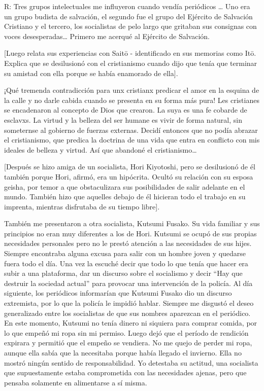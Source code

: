 \documentclass[
]{book}
\begin{document}
R: Tres grupos intelectuales me influyeron cuando vendía periódicos \ldots{} Uno era un grupo budista de salvación, el segundo fue el grupo del Ejército de Salvación Cristiano y el tercero, los socialistas de pelo largo que gritaban sus consignas con voces desesperadas\ldots{} Primero me acerqué al Ejército de Salvación.

{[}Luego relata sus experiencias con Saitō - identificado en sus memorias como Itō. Explica que se desilusionó con el cristianismo cuando dijo que tenía que terminar su amistad con ella porque se había enamorado de ella{]}.

¡Qué tremenda contradicción para unx cristianx predicar el amor en la esquina de la calle y no darle cabida cuando se presenta en su forma más pura! Les cristianes se encadenaron al concepto de Dios que crearon. La suya es una fe cobarde de esclavxs. La virtud y la belleza del ser humane es vivir de forma natural, sin someternse al gobierno de fuerzas externas. Decidí entonces que no podía abrazar el cristianismo, que predica la doctrina de una vida que entra en conflicto con mis ideales de belleza y virtud. Así que abandoné el cristianismo\ldots{}

{[}Después se hizo amiga de un socialista, Hori Kiyotoshi, pero se desilusionó de él también porque Hori, afirmó, era un hipócrita. Ocultó su relación con su esposa geisha, por temor a que obstaculizara sus posibilidades de salir adelante en el mundo. También hizo que aquelles debajo de él hicieran todo el trabajo en su imprenta, mientras disfrutaba de su tiempo libre{]}.

También me presentaron a otra socialista, Kutsumi Fusako. Su vida familiar y sus principios no eran muy diferentes a los de Hori. Kutsumi se ocupó de sus propias necesidades personales pero no le prestó atención a las necesidades de sus hijes. Siempre encontraba alguna excusa para salir con un hombre joven y quedarse fuera todo el día. Una vez la escuché decir que todo lo que tenía que hacer era subir a una plataforma, dar un discurso sobre el socialismo y decir ``Hay que destruir la sociedad actual'' para provocar una intervención de la policía. Al día siguiente, los periódicos informarían que Kutsumi Fusako dio un discurso extremista, por lo que la policía le impidió hablar. Siempre me disgustó el deseo generalizado entre los socialistas de que sus nombres aparezcan en el periódico. En este momento, Kutsumi no tenía dinero ni siquiera para comprar comida, por lo que empeñó mi ropa sin mi permiso. Luego dejó que el período de rendición expirara y permitió que el empeño se vendiera. No me quejo de perder mi ropa, aunque ella sabía que la necesitaba porque había llegado el invierno. Ella no mostró ningún sentido de responsabilidad. Yo detestaba su actitud, una socialista que supuestamente estaba comprometida con las necesidades ajenas, pero que pensaba solamente en alimentarse a sí misma.
\end{document}
